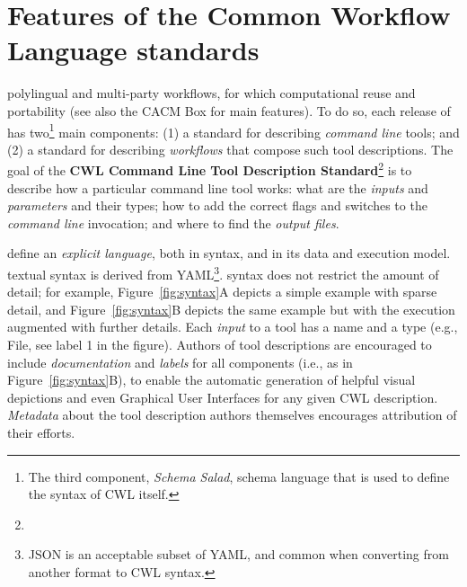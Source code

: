 \documentclass[sigconf,authordraft]{acmart}
\begin{document}
\section{Features of the Common Workflow Language standards}\label{sec:features}\label{sec:design}



 polylingual and multi-party workflows, for which  computational reuse and portability (see also the CACM Box for main features). To do so, each release of  has two\footnote{The third component, \textit{Schema Salad},  schema language that is used to define the syntax of CWL itself.} main components: (1) a standard for describing \textit{command line} tools; and (2) a standard for describing \textit{workflows} that compose such tool descriptions. The goal of the \textbf{CWL Command Line Tool Description Standard}\footnote{} is to describe how a particular command line tool works: what are the \textit{inputs} and \textit{parameters} and their types; how to add the correct flags and switches to the \textit{command line} invocation; and where to find the \textit{output files}. 

 define an \textit{explicit language}, both in syntax, and in its data and execution model.  textual syntax is derived from YAML\footnote{JSON is an acceptable subset of YAML, and common when converting from another format to CWL syntax.}.  syntax does not restrict the amount of detail; for example, Figure~\ref{fig:syntax}A depicts a simple example with sparse detail, and Figure~\ref{fig:syntax}B depicts the same example but with the execution augmented with further details. Each \textit{input} to a tool has a name and a type (e.g., File, see label 1 in the figure). %
Authors of tool descriptions are encouraged to include \textit{documentation} and \textit{labels} for all components (i.e., as in Figure~\ref{fig:syntax}B), to enable the automatic generation of helpful visual depictions and even Graphical User Interfaces %
for any given CWL description. \textit{Metadata} about the tool description authors themselves encourages attribution of their efforts. 
\end{document}
